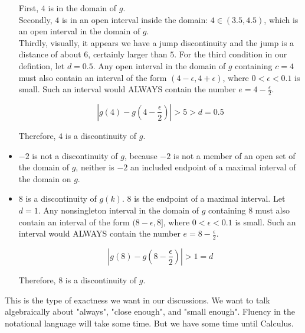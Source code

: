 \documentclass{ximera}
\begin{document}
\begin{example}
\begin{itemize}
First, $4$ is in the domain of $g$. \\


Secondly, $4$ is in an open interval inside the domain: $4 \in (3.5, 4.5)$, which is an open interval in the domain of $g$. \\

Thirdly, visually, it appears we have a jump discontinuity and the jump is a distance of about $6$, certainly larger than $5$. For the third condition in our defintion, let $d=0.5$. Any open interval in the domain of $g$ containing $c = 4$ must also contain an interval of the form $(4-\epsilon, 4+\epsilon)$, where $0 < \epsilon < 0.1$ is small.  Such an interval would ALWAYS contain the number $e = 4-\frac{\epsilon}{2}$.

\[ \left| g(4) - g\left(4-\frac{\epsilon}{2}\right) \right| > 5 > d = 0.5 \]

Therefore, $4$ is a discontinuity of $g$.


\item $-2$ is not a discontinuity of $g$, because $-2$ is not a member of an open set of the domain of $g$, neither is $-2$ an included endpoint of a maximal interval of the domain on $g$.




\item $8$ is a discontinuity of $g(k)$.  $8$ is the endpoint of a maximal interval. Let $d = 1$. Any nonsingleton interval in the domain of $g$ containing $8$ must also contain an interval of the form $(8-\epsilon, 8]$, where $0 < \epsilon < 0.1$ is small.  Such an interval would ALWAYS contain the number $e = 8-\frac{\epsilon}{2}$.

\[ \left| g(8) - g\left(8-\frac{\epsilon}{2}\right) \right| > 1 = d \]

Therefore, $8$ is a discontinuity of $g$.

\end{itemize}



\end{example}

This is the type of exactness we want in our discussions.  We want to talk algebraically about "always", "close enough", and "small enough".  Fluency in the notational language will take some time.  But we have some time until Calculus.
\end{document}
